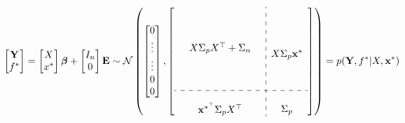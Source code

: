 \begin{gather}
    \begin{bmatrix}
        \mathbf{Y} \\
        f^{\ast}
    \end{bmatrix}
    = \begin{bmatrix} X \\ x^{\ast} \end{bmatrix} \boldsymbol{\beta} + \begin{bmatrix} I_n \\ 0 \end{bmatrix}  \mathbf{E}
    \sim \N \left(
        \begin{bmatrix}
        0 \\
        \vdots \\
        \vdots \\
        0 \\
        0
        \end{bmatrix},
        \left[
        \begin{array}{ c:c c c }
            \begin{matrix}
                & & \\
                & & \\
                & & \\
                & X \Sigma_p X^{\top} + \Sigma_n & \\
                & & \\
                & & \\
                & & \\
            \end{matrix}
            & \begin{matrix} \\ \\ \\ X \Sigma_p \mathbf{x}^{\ast} \\ \\ \\ \end{matrix} \\
            \hdashline \\
            \begin{matrix} &  \mathbf{x}^{\ast^{\top}}  \Sigma_p X^{\top} & \end{matrix} & \Sigma_p
        \end{array}
        \right]
        \right)
    = p(\mathbf{Y}, f^{\ast}| X, \mathbf{x}^{\ast})
\end{gather}

